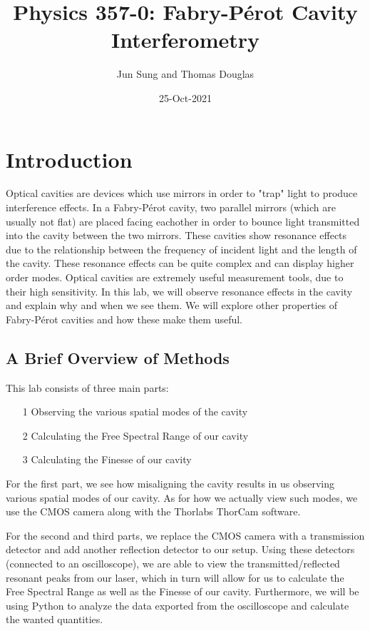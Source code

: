 \documentclass[twocolumn,amsmath,amssymb,pra]{revtex4-2}
\begin{document}
\title{Physics 357-0: Fabry-P\'{e}rot Cavity Interferometry}

\author{Jun Sung and Thomas Douglas}

\date{25-Oct-2021}

\maketitle

\section{Introduction}
Optical cavities are devices which use mirrors in order to "trap" light to produce interference effects. In a Fabry-P\'{e}rot cavity, two parallel mirrors (which are usually not flat) are placed facing eachother in order to bounce light transmitted into the cavity between the two mirrors. These cavities show resonance effects due to the relationship between the frequency of incident light and the length of the cavity. These resonance effects can be quite complex and can display higher order modes. Optical cavities are extremely useful measurement tools, due to their high sensitivity. In this lab, we will observe resonance effects in the cavity and explain why and when we see them. We will explore other properties of Fabry-P\'{e}rot cavities and how these make them useful.

\subsection{A Brief Overview of Methods}
This lab consists of three main parts: 
\begin{itemize}
    \item[1] Observing the various spatial modes of the cavity
    \item[2] Calculating the Free Spectral Range of our cavity
    \item[3] Calculating the Finesse of our cavity
\end{itemize}
For the first part, we see how misaligning the cavity results in us observing various spatial modes of our cavity. As for how we actually view such modes, we use the CMOS camera along with the Thorlabs ThorCam software. 

For the second and third parts, we replace the CMOS camera with a transmission detector and add another reflection detector to our setup. Using these detectors (connected to an oscilloscope), we are able to view the transmitted/reflected resonant peaks from our laser, which in turn will allow for us to calculate the Free Spectral Range as well as the Finesse of our cavity. Furthermore, we will be using Python to analyze the data exported from the oscilloscope and calculate the wanted quantities.
\end{document}
